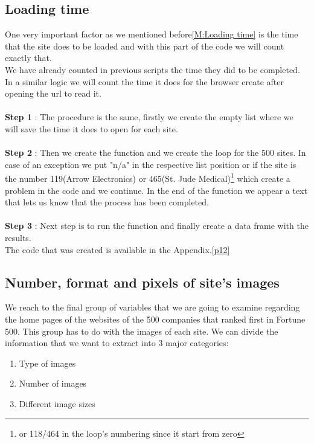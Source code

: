 \documentclass{book}
\begin{document}
\subsection{Loading time}
One very important factor as we mentioned before\ref{M:Loading time} is the time that the site does to be loaded and with this part of the code we will count exactly that.\\
We have already counted in previous scripts the time they did to be completed. In a similar logic we will count the time it does for the browser create after opening the url to read it.\\\\
\textbf{Step 1} : The procedure is the same, firstly we create the empty list where we will save the time it does to open for each site. \\\\
\textbf{Step 2} : Then we create the function and we create the loop for the 500 sites. In case of an exception we put "n/a" in the respective list position or if the site is the number 119(Arrow Electronics) or 465(St. Jude Medical)\footnote{or 118/464 in the loop's numbering since it start from zero} which create a problem in the code and we continue. In the end of the function we appear a text that lets us know that the process has been completed.\\\\
\textbf{Step 3} : Next step is to run the function and finally create a data frame with the results.\\
The code that was created is available in the Appendix.\ref{p12}

\subsection{Number, format and pixels of site's images}
We reach to the final group of variables that we are going to examine regarding the home pages of the websites of the 500 companies that ranked first in Fortune 500. This group has to do with the images of each site. We can divide the information that we want to extract into 3 major categories:
\begin{enumerate}
\item Type of images
\item Number of images
\item Different image sizes
\end{enumerate}
\end{document}
